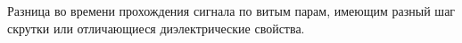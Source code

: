 Разница во времени прохождения сигнала по витым парам, имеющим
разный шаг скрутки или отличающиеся диэлектрические свойства.